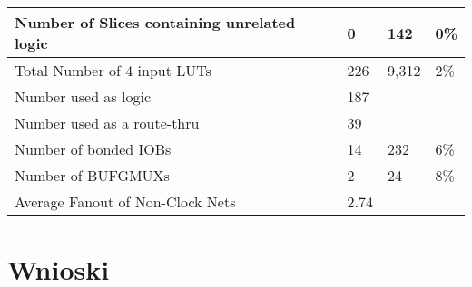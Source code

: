 \documentclass[11pt]{report}
\begin{document}
\begin{table}[hbt!]
\begin{tabular}{|l|l|l|l|}
    Number of Slices containing unrelated logic                & 0                                                          & 142                                                             & 0\%                                                               \\ \hline
    Total Number of 4 input LUTs                               & 226                                                        & 9,312                                                           & 2\%                                                               \\ \hline
    Number used as logic                                       & 187                                                        &                                                                 &                                                                   \\ \hline
    Number used as a route-thru                                & 39                                                         &                                                                 &                                                                   \\ \hline
    Number of bonded IOBs                                      & 14                                                         & 232                                                             & 6\%                                                               \\ \hline
    Number of BUFGMUXs                                         & 2                                                          & 24                                                              & 8\%                                                               \\ \hline
    Average Fanout of Non-Clock Nets                           & 2.74                                                       &                                                                 &                                                                   \\ \hline
    \end{tabular}
    \caption{}
    \label{Device Utilization Summary}
    \end{table}

\newpage
    
\section{Wnioski}
\end{document}
